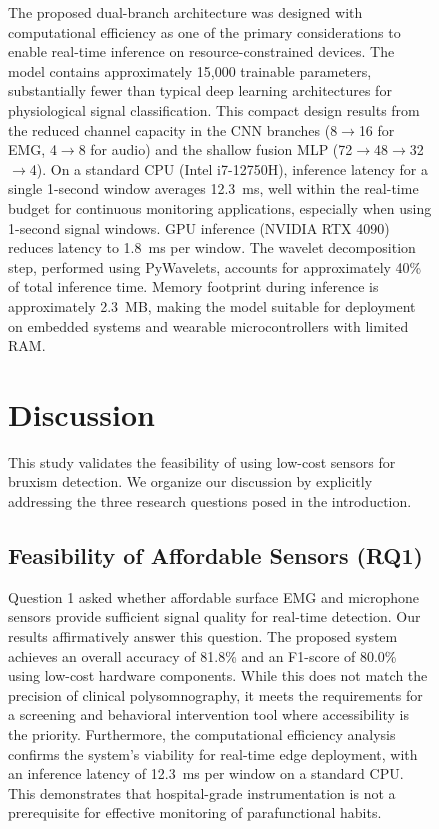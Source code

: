 \documentclass[pdflatex,sn-vancouver-num, iicol]{sn-jnl}
\begin{document}
\begin{figure}[h]
The proposed dual-branch architecture was designed with computational efficiency as one of the primary considerations to enable real-time inference on resource-constrained devices. The model contains approximately 15,000 trainable parameters, substantially fewer than typical deep learning architectures for physiological signal classification. This compact design results from the reduced channel capacity in the CNN branches (8$\rightarrow$16 for EMG, 4$\rightarrow$8 for audio) and the shallow fusion MLP (72$\rightarrow$48$\rightarrow$32$\rightarrow$4). On a standard CPU (Intel i7-12750H), inference latency for a single 1-second window averages 12.3~ms, well within the real-time budget for continuous monitoring applications, especially when using 1-second signal windows. GPU inference (NVIDIA RTX 4090) reduces latency to 1.8~ms per window. The wavelet decomposition step, performed using PyWavelets, accounts for approximately 40\% of total inference time. Memory footprint during inference is approximately 2.3~MB, making the model suitable for deployment on embedded systems and wearable microcontrollers with limited RAM.


\section{Discussion}

This study validates the feasibility of using low-cost sensors for bruxism detection. We organize our discussion by explicitly addressing the three research questions posed in the introduction.

\subsection{Feasibility of Affordable Sensors (RQ1)}
Question 1 asked whether affordable surface EMG and microphone sensors provide sufficient signal quality for real-time detection. Our results affirmatively answer this question. The proposed system achieves an overall accuracy of 81.8\% and an F1-score of 80.0\% using low-cost hardware components. While this does not match the precision of clinical polysomnography, it meets the requirements for a screening and behavioral intervention tool where accessibility is the priority. Furthermore, the computational efficiency analysis confirms the system's viability for real-time edge deployment, with an inference latency of 12.3~ms per window on a standard CPU. This demonstrates that hospital-grade instrumentation is not a prerequisite for effective monitoring of parafunctional habits.


\end{figure}
\end{document}
